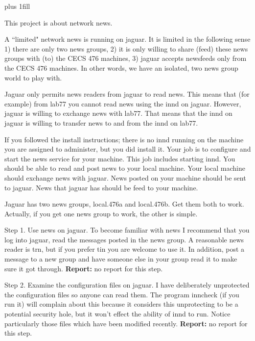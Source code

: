 
\rightskip=0pt plus 1fill

\parindent 0pt

This project is about network news.

A ``limited" network news is running on jaguar.
It is limited in the following sense
1) there are only two news groups,
2) it is only willing to share (feed) these news groups with (to) the CECS 476
machines,
3) jaguar accepts newsfeeds only from the CECS 476 machines.
In other words, we have an isolated, two news group world to play with.

Jaguar only permits news readers from jaguar to read news.
This means that (for example) from {\ltt{}lab77} you cannot
read news using the {\ltt{}innd} on jaguar.
However, jaguar is willing to exchange news with {\ltt{}lab77}.
That means that the {\ltt{}innd} on {\ltt{}jaguar} is willing to transfer
news to and from the {\ltt{}innd} on {\ltt{}lab77}.

If you followed the install instructions;
there is no {\ltt{}innd} running on the machine you are assigned to administer,
but you did install it.
Your job is to configure and start the news service for your machine.
This job includes starting {\ltt{}innd}.
You should be able to read and post news to your local machine.
Your local machine should exchange news with {\ltt{}jaguar}.
News posted on your machine should be sent to {\ltt{}jaguar}.
News that {\ltt{}jaguar} has should be feed to your machine.

Jaguar has two news groups, {\ltt{}local.476a} and {\ltt{}local.476b}.
Get them both to work.
Actually, if you get one news group to work, the other is simple.

Step 1. Use news on {\ltt{}jaguar}.
To become familiar with news I recommend that you log into {\ltt{}jaguar},
read the messages posted in the news group.
A reasonable news reader is {\ltt{}trn},
but if you prefer {\ltt{}tin} you are welcome to use it.
In addition, post a message to a new group and have someone else in your group
read it to make sure it got through.
\hfill\break
{\bf Report:} no report for this step.

Step 2.
Examine the configuration files on {\ltt{}jaguar}.
I have deliberately unprotected the configuration files so anyone can read
them.
The program {\ltt{}inncheck} (if you run it) will complain about this 
because it considers this unprotecting to be a potential security hole,
but it won't effect the ability of {\ltt{}innd} to run.
Notice particularly those files which have been modified recently.
\hfill\break
{\bf Report:} no report for this step.

